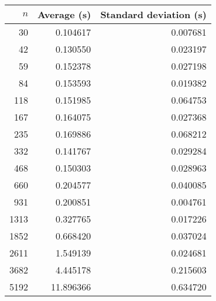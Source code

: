 \begin{tabular}{rrr}
$n$ & Average (s) & Standard deviation (s)\\\hline
30 & 0.104617 & 0.007681\\
42 & 0.130550 & 0.023197\\
59 & 0.152378 & 0.027198\\
84 & 0.153593 & 0.019382\\
118 & 0.151985 & 0.064753\\
167 & 0.164075 & 0.027368\\
235 & 0.169886 & 0.068212\\
332 & 0.141767 & 0.029284\\
468 & 0.150303 & 0.028963\\
660 & 0.204577 & 0.040085\\
931 & 0.200851 & 0.004761\\
1313 & 0.327765 & 0.017226\\
1852 & 0.668420 & 0.037024\\
2611 & 1.549139 & 0.024681\\
3682 & 4.445178 & 0.215603\\
5192 & 11.896366 & 0.634720\\
\end{tabular}
